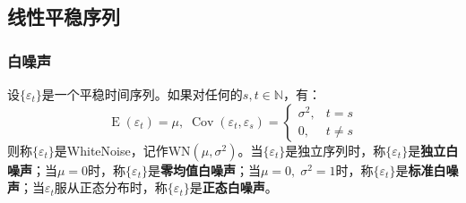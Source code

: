 \subsection{线性平稳序列}
\subsubsection{白噪声}
\begin{definition}
	设$\{\varepsilon_t\}$是一个平稳时间序列。如果对任何的$s,t\in\mathbb{N}$，有：
	\begin{equation*}
		\operatorname{E}(\varepsilon_t)=\mu,\;
		\operatorname{Cov}(\varepsilon_t,\varepsilon_s)=
		\begin{cases}
			\sigma^2, & t=s \\
			0, & t\ne s
		\end{cases}
	\end{equation*}
	则称$\{\varepsilon_t\}$是\gls{WhiteNoise}，记作WN$(\mu,\sigma^2)$。当$\{\varepsilon_t\}$是独立序列时，称$\{\varepsilon_t\}$是\textbf{独立白噪声}；当$\mu=0$时，称$\{\varepsilon_t\}$是\textbf{零均值白噪声}；当$\mu=0,\;\sigma^2=1$时，称$\{\varepsilon_t\}$是\textbf{标准白噪声}；当$\varepsilon_t$服从正态分布时，称$\{\varepsilon_t\}$是\textbf{正态白噪声}。
\end{definition}
